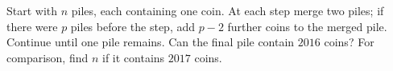 Start with $n$ piles, each containing one coin. At each step merge two piles; if there were $p$ piles before the step, add $p-2$ further coins to the merged pile. Continue until one pile remains. Can the final pile contain $2016$ coins? For comparison, find $n$ if it contains $2017$ coins.
